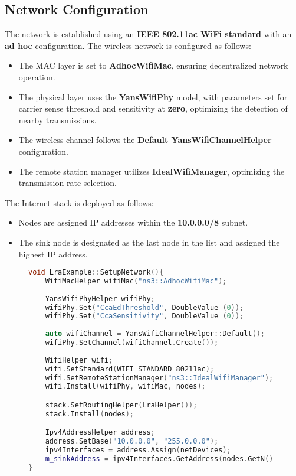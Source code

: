 \documentclass[../report.tex]{subfiles}
\begin{document}
\subsection{Network Configuration}
The network is established using an \textbf{IEEE 802.11ac WiFi standard} with an \textbf{ad hoc} configuration. The wireless network is configured as follows:

\begin{itemize}
    \item The MAC layer is set to \textbf{AdhocWifiMac}, ensuring decentralized network operation.
    \item The physical layer uses the \textbf{YansWifiPhy} model, with parameters set for carrier sense threshold and sensitivity at \textbf{zero}, optimizing the detection of nearby transmissions.
    \item The wireless channel follows the \textbf{Default YansWifiChannelHelper} configuration.
    \item The remote station manager utilizes \textbf{IdealWifiManager}, optimizing the transmission rate selection.
\end{itemize}

The Internet stack is deployed as follows:

\begin{itemize}
    \item Nodes are assigned IP addresses within the \textbf{10.0.0.0/8} subnet.
    \item The sink node is designated as the last node in the list and assigned the highest IP address.
\end{itemize}

\begin{figure}[H] %
\begin{lstlisting}[language=C++, caption={Simulation Network Setup},captionpos=b]
void LraExample::SetupNetwork(){
    WifiMacHelper wifiMac("ns3::AdhocWifiMac");
    
    YansWifiPhyHelper wifiPhy;
    wifiPhy.Set("CcaEdThreshold", DoubleValue (0));
    wifiPhy.Set("CcaSensitivity", DoubleValue (0));
    
    auto wifiChannel = YansWifiChannelHelper::Default();
    wifiPhy.SetChannel(wifiChannel.Create());
    
    WifiHelper wifi;
    wifi.SetStandard(WIFI_STANDARD_80211ac);
    wifi.SetRemoteStationManager("ns3::IdealWifiManager");
    wifi.Install(wifiPhy, wifiMac, nodes);

    stack.SetRoutingHelper(LraHelper());
    stack.Install(nodes);

    Ipv4AddressHelper address;
    address.SetBase("10.0.0.0", "255.0.0.0");
    ipv4Interfaces = address.Assign(netDevices);
    m_sinkAddress = ipv4Interfaces.GetAddress(nodes.GetN() - 1);
}
\end{lstlisting}
\end{figure}
\end{document}
